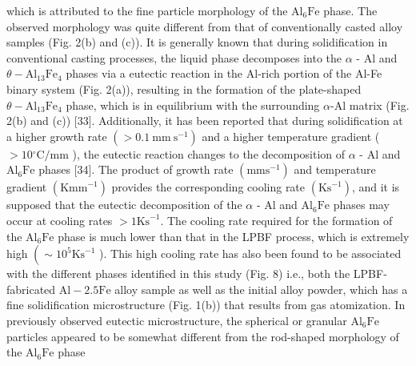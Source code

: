 \documentclass[10pt]{article}
\begin{document}
which is attributed to the fine particle morphology of the $\mathrm{Al}_{6} \mathrm{Fe}$ phase. The observed morphology was quite different from that of conventionally casted alloy samples (Fig. 2(b) and (c)). It is generally known that during solidification in conventional casting processes, the liquid phase decomposes into the $\alpha$ - $\mathrm{Al}$ and $\theta-\mathrm{Al}_{13} \mathrm{Fe}_{4}$ phases via a eutectic reaction in the Al-rich portion of the Al-Fe binary system (Fig. 2(a)), resulting in the formation of the plate-shaped $\theta-\mathrm{Al}_{13} \mathrm{Fe}_{4}$ phase, which is in equilibrium with the surrounding $\alpha$-Al matrix (Fig. 2(b) and (c)) [33]. Additionally, it has been reported that during solidification at a higher growth rate $\left(>0.1 \mathrm{~mm} \mathrm{~s}^{-1}\right)$ and a higher temperature gradient ( $>10{ }^{\circ} \mathrm{C} / \mathrm{mm}$ ), the eutectic reaction changes to the decomposition of $\alpha$ - $\mathrm{Al}$ and $\mathrm{Al}_{6} \mathrm{Fe}$ phases [34]. The product of growth rate $\left(\mathrm{mm} \mathrm{s}^{-1}\right)$ and temperature gradient $\left(\mathrm{Kmm}^{-1}\right)$ provides the corresponding cooling rate $\left(\mathrm{Ks}^{-1}\right)$, and it is supposed that the eutectic decomposition of the $\alpha$ - $\mathrm{Al}$ and $\mathrm{Al}_{6} \mathrm{Fe}$ phases may occur at cooling rates $>1 \mathrm{Ks}^{-1}$. The cooling rate required for the formation of the $\mathrm{Al}_{6} \mathrm{Fe}$ phase is much lower than that in the LPBF process, which is extremely high $\left(\sim 10^{5} \mathrm{Ks}^{-1}\right.$ ). This high cooling rate has also been found to be associated with the different phases identified in this study (Fig. 8) i.e., both the LPBF-fabricated $\mathrm{Al}-2.5 \mathrm{Fe}$ alloy sample as well as the initial alloy powder, which has a fine solidification microstructure (Fig. 1(b)) that results from gas atomization. In previously observed eutectic microstructure, the spherical or granular $\mathrm{Al}_{6} \mathrm{Fe}$ particles appeared to be somewhat different from the rod-shaped morphology of the $\mathrm{Al}_{6} \mathrm{Fe}$ phase\\
\end{document}
